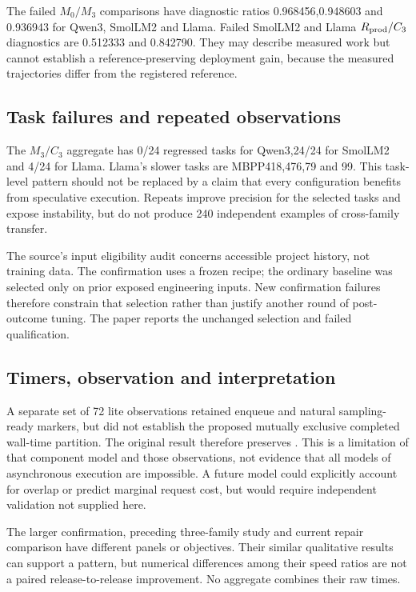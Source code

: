 The failed $M_0/M_3$ comparisons have diagnostic ratios 0.968456,0.948603 and 0.936943 for Qwen3, SmolLM2 and Llama. Failed SmolLM2 and Llama $R_{\rm prod}/C_3$ diagnostics are 0.512333 and 0.842790. They may describe measured work but cannot establish a reference-preserving deployment gain, because the measured trajectories differ from the registered reference.

\subsection{Task failures and repeated observations}
The $M_3/C_3$ aggregate has 0/24 regressed tasks for Qwen3,24/24 for SmolLM2 and 4/24 for Llama. Llama's slower tasks are MBPP418,476,79 and 99. This task-level pattern should not be replaced by a claim that every configuration benefits from speculative execution. Repeats improve precision for the selected tasks and expose instability, but do not produce 240 independent examples of cross-family transfer.

The source's input eligibility audit concerns accessible project history, not training data. The confirmation uses a frozen recipe; the ordinary baseline was selected only on prior exposed engineering inputs. New confirmation failures therefore constrain that selection rather than justify another round of post-outcome tuning. The paper reports the unchanged selection and failed qualification.

\subsection{Timers, observation and interpretation}
A separate set of 72 lite observations retained enqueue and natural sampling-ready markers, but did not establish the proposed mutually exclusive completed wall-time partition. The original result therefore preserves . This is a limitation of that component model and those observations, not evidence that all models of asynchronous execution are impossible. A future model could explicitly account for overlap or predict marginal request cost, but would require independent validation not supplied here.

The larger confirmation, preceding three-family study and current repair comparison have different panels or objectives. Their similar qualitative results can support a pattern, but numerical differences among their speed ratios are not a paired release-to-release improvement. No aggregate combines their raw times.
